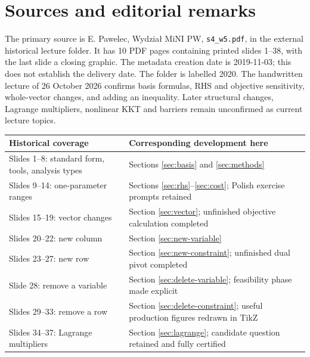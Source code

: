 \documentclass[11pt,a4paper]{article}
\begin{document}
\section{Sources and editorial remarks}\label{sec:sources}
{\small
  The primary source is E. Pawelec, Wydział MiNI PW,
  \texttt{s4\_w5.pdf}, in the external historical lecture folder.
  It has 10 PDF pages containing printed slides 1--38, with the last slide a
  closing graphic. The metadata creation date is 2019-11-03; this does not
  establish the delivery date. The folder is labelled 2020.
  The handwritten lecture of 26 October 2026 confirms basis formulas,
  RHS and objective sensitivity, whole-vector changes, and adding an inequality.
  Later structural changes, Lagrange multipliers, nonlinear KKT and barriers
  remain unconfirmed as current lecture topics.

  \begin{center}
    \begin{tabular}{>{\raggedright\arraybackslash}p{4.4cm}>{\raggedright\arraybackslash}p{8.4cm}}\toprule
      Historical coverage & Corresponding development here\\\midrule
      Slides 1--8: standard form, tools, analysis types & Sections \ref{sec:basis} and \ref{sec:methods}\\
      Slides 9--14: one-parameter ranges & Sections \ref{sec:rhs}--\ref{sec:cost}; Polish exercise prompts retained\\
      Slides 15--19: vector changes & Section \ref{sec:vector}; unfinished objective calculation completed\\
      Slides 20--22: new column & Section \ref{sec:new-variable}\\
      Slides 23--27: new row & Section \ref{sec:new-constraint}; unfinished dual pivot completed\\
      Slide 28: remove a variable & Section \ref{sec:delete-variable}; feasibility phase made explicit\\
      Slides 29--33: remove a row & Section \ref{sec:delete-constraint}; useful production figures redrawn in TikZ\\
      Slides 34--37: Lagrange multipliers & Section \ref{sec:lagrange}; candidate question retained and fully certified\\\bottomrule
    \end{tabular}
  \end{center}
}
\end{document}
